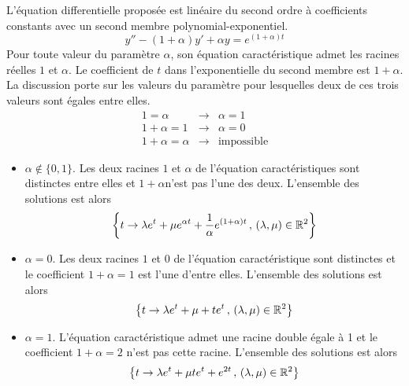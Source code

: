 L'équation differentielle proposée est linéaire du second ordre à coefficients constants avec un second membre polynomial-exponentiel.
\[y''-(1+\alpha)y'+\alpha y = e^{(1+\alpha) t}\]
Pour toute valeur du paramètre $\alpha$, son équation caractéristique admet les racines réelles $1$ et $\alpha$. Le coefficient de $t$ dans l'exponentielle du second membre est $1+\alpha$.\newline
 La discussion porte sur les valeurs du paramètre pour lesquelles deux de ces trois valeurs sont égales entre elles.
\begin{eqnarray*}
 1=\alpha &\longrightarrow& \alpha=1 \\
1+\alpha = 1 &\longrightarrow& \alpha=0 \\
1+\alpha = \alpha &\longrightarrow& \mathrm{impossible}
\end{eqnarray*}
\begin{itemize}
 \item $\alpha \not\in \{0,1\}$. Les deux racines $1$ et $\alpha$ de l'équation caractéristiques sont distinctes entre elles et $1+\alpha$n'est pas l'une des deux. L'ensemble des solutions est alors
\[\left\lbrace t\rightarrow \lambda e^t + \mu e^{\alpha t} +\frac{1}{\alpha}e^{(1+\alpha)t}\,,\,(\lambda, \mu)\in\mathbb{R}^2\right\rbrace \]
\item $\alpha=0$. Les deux racines $1$ et $0$ de l'équation caractéristique sont distinctes et le coefficient $1+\alpha=1$ est l'une d'entre elles. L'ensemble des solutions est alors
\[\left\lbrace t\rightarrow \lambda e^t + \mu  +te^{t}\,,\,(\lambda, \mu)\in\mathbb{R}^2\right\rbrace \]
\item $\alpha=1$. L'équation caractéristique admet une racine double égale à 1 et le coefficient $1+\alpha=2$ n'est pas cette racine. L'ensemble des solutions est alors
\[\left\lbrace t\rightarrow \lambda e^t + \mu te^{ t} +e^{2t}\,,\,(\lambda, \mu)\in\mathbb{R}^2\right\rbrace \]
\end{itemize}

 